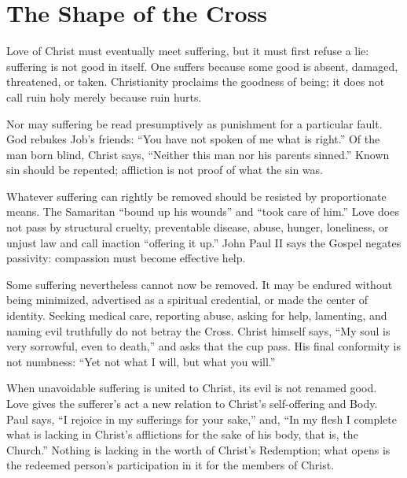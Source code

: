 \section{The Shape of the Cross}

Love of Christ must eventually meet suffering, but it must first refuse a lie: suffering is not good in itself. One suffers because some good is absent, damaged, threatened, or taken. Christianity proclaims the goodness of being; it does not call ruin holy merely because ruin hurts.

Nor may suffering be read presumptively as punishment for a particular fault. God rebukes Job's friends: ``You have not spoken of me what is right.'' Of the man born blind, Christ says, ``Neither this man nor his parents sinned.'' Known sin should be repented; affliction is not proof of what the sin was.

Whatever suffering can rightly be removed should be resisted by proportionate means. The Samaritan ``bound up his wounds'' and ``took care of him.'' Love does not pass by structural cruelty, preventable disease, abuse, hunger, loneliness, or unjust law and call inaction ``offering it up.'' John Paul II says the Gospel negates passivity: compassion must become effective help.

Some suffering nevertheless cannot now be removed. It may be endured without being minimized, advertised as a spiritual credential, or made the center of identity. Seeking medical care, reporting abuse, asking for help, lamenting, and naming evil truthfully do not betray the Cross. Christ himself says, ``My soul is very sorrowful, even to death,'' and asks that the cup pass. His final conformity is not numbness: ``Yet not what I will, but what you will.''

When unavoidable suffering is united to Christ, its evil is not renamed good. Love gives the sufferer's act a new relation to Christ's self-offering and Body. Paul says, ``I rejoice in my sufferings for your sake,'' and, ``In my flesh I complete what is lacking in Christ's afflictions for the sake of his body, that is, the Church.'' Nothing is lacking in the worth of Christ's Redemption; what opens is the redeemed person's participation in it for the members of Christ.

